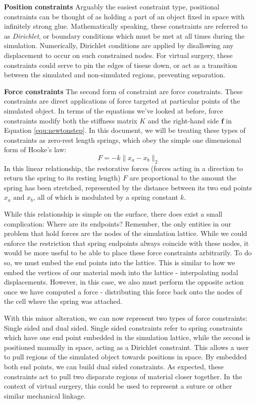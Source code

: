   \textbf{Position constraints} Arguably the easiest constraint type,
  positional constraints can be thought of as holding a part of an
  object fixed in space with infinitely strong glue. Mathematically
  speaking, these constraints are referred to as \textit{Dirichlet}, or
  boundary conditions which must be met at all times during the
  simulation. Numerically, Dirichlet conditions are applied by
  disallowing any displacement to occur on such constrained nodes. For
  virtual surgery, these constraints could serve to pin the edges of
  tissue down, or act as a transition between the simulated and
  non-simulated regions, preventing separation. 

  \textbf{Force constraints} The second form of constraint are force
  constraints. These constraints are direct applications of force
  targeted at particular points of the simulated object. In terms of
  the equations we've looked at before, force constraints modify both
  the stiffness matrix $K$ and the right-hand side $\mathbf f$ in
  Equation \ref{equ:newtonstep}. In this document, we will be treating
  these types of constraints as zero-rest length springs, which obey
  the simple one dimensional form of Hooke's law:
  \begin{equation}
    \label{equ:hookeslaw}
    F = -k\lVert x_a - x_b\rVert_2
  \end{equation}
  In this linear relationship, the restorative forces (forces acting
  in a direction to return the spring to its resting length) $F$ are proportional to the
  amount the spring has been stretched, represented by the distance
  between its two end points $x_a$ and $x_b$, all of which is
  modulated by a spring constant $k$.

  While this relationship is simple on the surface, there does exist a
  small complication: Where are its endpoints? Remember, the only
  entities in our problem that hold forces are the nodes of the
  simulation lattice. While we could enforce the restriction that
  spring endpoints always coincide with these nodes, it would be more
  useful to be able to place these force constraints arbitrarily. To
  do so, we must embed the end points into the lattice. This is
  similar to how we embed the vertices of our material mesh into the
  lattice - interpolating nodal displacements. However, in this case,
  we also must perform the opposite action once we have computed a
  force - distributing this force back onto the nodes of the cell
  where the spring was attached.

  With this minor alteration, we can now represent two types of force
  constraints: Single sided and dual sided. Single sided constraints
  refer to spring constraints which have one end point embedded in the
  simulation lattice, while the second is positioned manually in
  space, acting as a Dirichlet constraint. This allows a user to pull
  regions of the simulated object towards positions in space. By
  embedded both end points, we can build dual sided constraints. As
  expected, these constraints act to pull two disparate regions of
  material closer together. In the context of virtual surgery, this
  could be used to represent a suture or other similar mechanical linkage.
  
